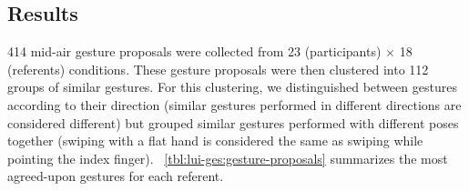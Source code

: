 

\subsection{Results} \label{app:lui-ges:results}
414 mid-air gesture proposals were collected from 23 (participants) $\times$ 18 (referents) conditions. These gesture proposals were then clustered into 112 groups of similar gestures. For this clustering, we distinguished between gestures according to their direction (\ie similar gestures performed in different directions are considered different) but grouped similar gestures performed with different poses together (\eg swiping with a flat hand is considered the same as swiping while pointing the index finger). \tab~\ref{tbl:lui-ges:gesture-proposals} summarizes the most agreed-upon gestures for each referent.

